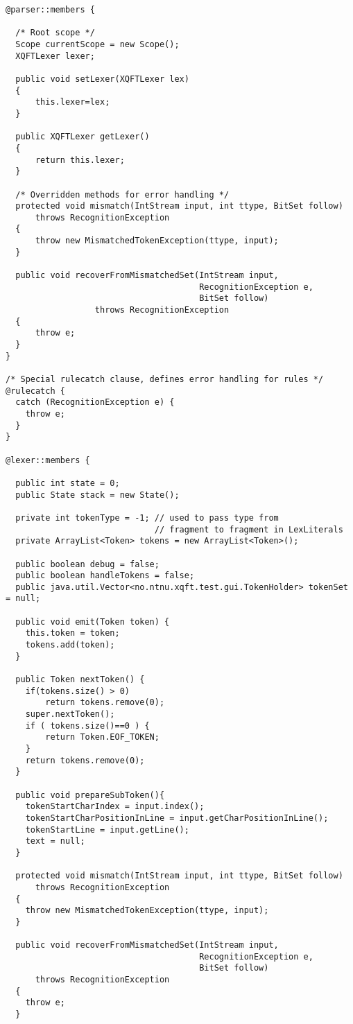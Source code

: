 \begin{Verbatim}[frame=none, fontsize=\footnotesize]
@parser::members {

  /* Root scope */
  Scope currentScope = new Scope();
  XQFTLexer lexer;
  
  public void setLexer(XQFTLexer lex)
  {
      this.lexer=lex;
  }
  
  public XQFTLexer getLexer()
  {
      return this.lexer;
  }

  /* Overridden methods for error handling */
  protected void mismatch(IntStream input, int ttype, BitSet follow)
      throws RecognitionException
  {
      throw new MismatchedTokenException(ttype, input);
  }

  public void recoverFromMismatchedSet(IntStream input, 
                                       RecognitionException e, 
                                       BitSet follow)
                  throws RecognitionException
  {
      throw e;
  }
}

/* Special rulecatch clause, defines error handling for rules */
@rulecatch {
  catch (RecognitionException e) {
    throw e;
  }
}

@lexer::members {

  public int state = 0;
  public State stack = new State();

  private int tokenType = -1; // used to pass type from 
                              // fragment to fragment in LexLiterals
  private ArrayList<Token> tokens = new ArrayList<Token>();

  public boolean debug = false;
  public boolean handleTokens = false;
  public java.util.Vector<no.ntnu.xqft.test.gui.TokenHolder> tokenSet = null;

  public void emit(Token token) {
    this.token = token;
    tokens.add(token);
  }

  public Token nextToken() {
    if(tokens.size() > 0)
        return tokens.remove(0);
    super.nextToken();
    if ( tokens.size()==0 ) {
        return Token.EOF_TOKEN;
    }
    return tokens.remove(0);
  }

  public void prepareSubToken(){
    tokenStartCharIndex = input.index();
    tokenStartCharPositionInLine = input.getCharPositionInLine();
    tokenStartLine = input.getLine();
    text = null;
  }

  protected void mismatch(IntStream input, int ttype, BitSet follow)
      throws RecognitionException
  {
    throw new MismatchedTokenException(ttype, input);
  }

  public void recoverFromMismatchedSet(IntStream input, 
                                       RecognitionException e,
                                       BitSet follow)
      throws RecognitionException
  {
    throw e;
  }



\end{Verbatim}
